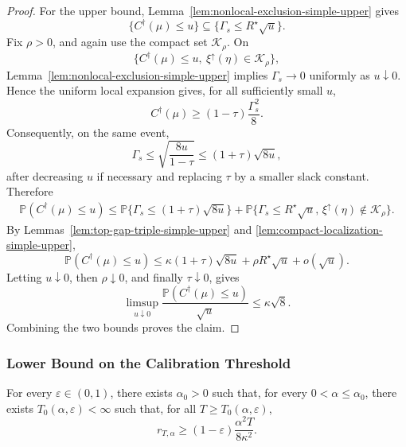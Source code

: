 \documentclass[10pt]{article}
\theoremstyle{plain}
\begin{document}
\begin{proof}
For the upper bound, Lemma~\ref{lem:nonlocal-exclusion-simple-upper} gives
\[
    \{C^\dagger(\mu)\le u\}
    \subseteq
    \{\Gamma_s\le R^\star\sqrt u\}.
\]
Fix \(\rho>0\), and again use the compact set \(\mathcal K_\rho\).  On
\[
    \{C^\dagger(\mu)\le u,\ \xi^\uparrow(\eta)\in\mathcal K_\rho\},
\]
Lemma~\ref{lem:nonlocal-exclusion-simple-upper} implies
\(\Gamma_s\to0\) uniformly as \(u\downarrow0\).  Hence the uniform local
expansion gives, for all sufficiently small \(u\),
\[
    C^\dagger(\mu)
    \ge
    (1-\tau)\frac{\Gamma_s^2}{8}.
\]
Consequently, on the same event,
\[
    \Gamma_s
    \le
    \sqrt{\frac{8u}{1-\tau}}
    \le
    (1+\tau)\sqrt{8u},
\]
after decreasing \(u\) if necessary and replacing \(\tau\) by a smaller slack
constant.  Therefore
\[
\begin{aligned}
    \mathbb P(C^\dagger(\mu)\le u)
    \le
    \mathbb P\{\Gamma_s\le (1+\tau)\sqrt{8u}\} 
    +
    \mathbb P\{\Gamma_s\le R^\star\sqrt u,\,
    \xi^\uparrow(\eta)\notin\mathcal K_\rho\}.
\end{aligned}
\]
By Lemmas~\ref{lem:top-gap-triple-simple-upper} and
\ref{lem:compact-localization-simple-upper},
\[
    \mathbb P(C^\dagger(\mu)\le u)
    \le
    \kappa(1+\tau)\sqrt{8u}
    +
    \rho R^\star\sqrt u
    +
    o(\sqrt u).
\]
Letting \(u\downarrow0\), then \(\rho\downarrow0\), and finally
\(\tau\downarrow0\), gives
\[
    \limsup_{u\downarrow0}
    \frac{\mathbb P(C^\dagger(\mu)\le u)}{\sqrt u}
    \le
    \kappa\sqrt8.
\]
Combining the two bounds proves the claim.

\end{proof}

\subsubsection{Lower Bound on the Calibration Threshold}

\begin{lemma}
\label{lem:threshold-simple-upper}
For every \(\varepsilon\in(0,1)\), there exists \(\alpha_0>0\) such that, for
every \(0<\alpha\le\alpha_0\), there exists
\(T_0(\alpha,\varepsilon)<\infty\) such that, for all
\(T\ge T_0(\alpha,\varepsilon)\),
\[
    r_{T,\alpha}
    \ge
    (1-\varepsilon)\frac{\alpha^2T}{8\kappa^2}.
\]
\end{lemma}
\end{document}
